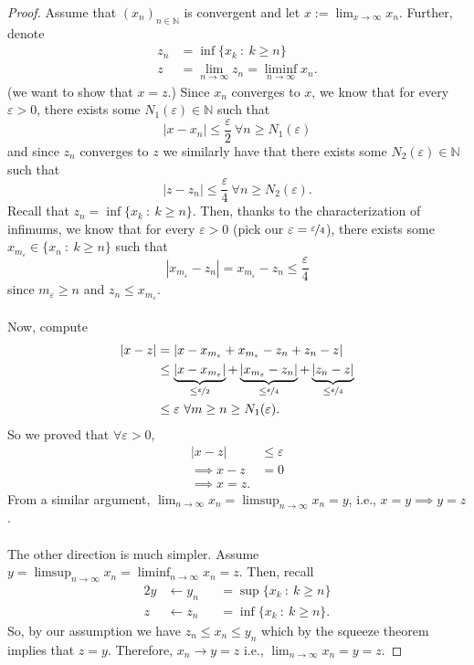 \documentclass{article}
\newcommand{\N}{\mathbb{N}}
\newcommand{\seq}[2]{(#1_{#2})_{#2 \in \N}}
\newcommand{\mylim}[2]{\lim_{#1 \to #2}}
\newcommand{\?}{\stackrel{?}{=}}
\theoremstyle{definition} %
\begin{document}
\begin{itemize}
\begin{proof}
        Assume that $\seq{x}{n}$ is convergent and let $x := \mylim{x}{\infty} x_n$. Further, denote
        \begin{align*}
            z_n &= \inf\{x_k \ : \ k \geq n\} \\
            z &= \mylim{n}{\infty} z_n = \liminf_{n \to \infty} x_n.
        \end{align*}
        (we want to show that $x = z$.)
        Since $x_n$ converges to $x$, we know that for every $\varepsilon > 0$, there exists some $N_1(\varepsilon) \in \N$ such that
        $$|x - x_n| \leq \frac{\varepsilon}{2} \ \forall n \geq N_1(\varepsilon)$$
        and since $z_n$ converges to $z$ we similarly have that there exists some $N_2(\varepsilon) \in \N$ such that
        $$|z - z_n| \leq \frac{\varepsilon}{4} \ \forall n \geq N_2(\varepsilon).$$
        Recall that $z_n = \inf\{x_k \ : \ k \geq n\}$. Then, thanks to the characterization of infimums, we know that for every $\varepsilon > 0$ (pick our $\varepsilon = \nicefrac{\varepsilon}{4}$), there exists some $x_{m_\varepsilon} \in \{x_n \ : \ k \geq n\}$ such that
        $$|x_{m_\varepsilon} - z_n| = x_{m_\varepsilon} - z_n \leq \frac{\varepsilon}{4}$$
        since $m_\varepsilon \geq n$ and $z_n \leq x_{m_\varepsilon}$. \\\\
        Now, compute
        \begin{align*}
            |x - z| &= |x - x_{m_\varepsilon} + x_{m_\varepsilon} - z_n + z_n - z| \\
            &\leq \underbrace{|x - x_{m_\varepsilon}|}_{\leq \nicefrac{\varepsilon}{2}} + \underbrace{|x_{m_\varepsilon} - z_n|}_{\leq \nicefrac{\varepsilon}{4}} + \underbrace{|z_n - z|}_{\leq \nicefrac{\varepsilon}{4}} \\
            &\leq \varepsilon \ \forall m \geq n \geq N_1(\varepsilon).
        \end{align*}
        So we proved that $\forall \varepsilon > 0$,
        \begin{align*}
            |x - z| &\leq \varepsilon \\
            \implies x - z &= 0 \\
            \implies x = z.
        \end{align*}
        From a similar argument, $\mylim{n}{\infty} x_n = \limsup_{n \to \infty} x_n = y$, i.e., $x = y \implies y = z$. \\\\
        The other direction is much simpler. Assume $y = \limsup_{n \to \infty} x_n = \liminf_{n \to \infty} x_n = z$. Then, recall
        \begin{alignat*}{2}
            y &\leftarrow y_n &&= \sup\{x_k \ : \ k \geq n\} \\
            z &\leftarrow z_n &&= \inf\{x_k \ : \ k \geq n\}.
        \end{alignat*}
        So, by our assumption we have $z_n \leq x_n \leq y_n$ which by the squeeze theorem implies that $z = y$. Therefore, $x_n \rightarrow y = z$ i.e., $\lim_{n \to \infty} x_n = y = z$.
    \end{proof}
\end{itemize}
\end{document}
